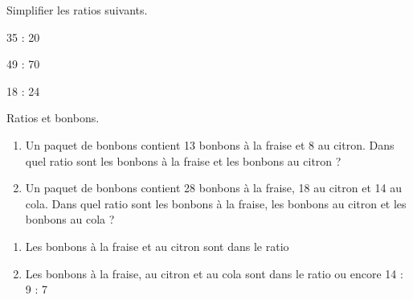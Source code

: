 \begin{Maquette}[Fiche,CorrigeFin,Colonnes=2]{}
   
   \begin{multicols}{2}

      \begin{exercice} %
         Simplifier les ratios suivants.
         \begin{colenumerate}[3]
            \item 35 : 20
            \item 49 : 70
            \item 18 : 24
         \end{colenumerate}
      \end{exercice}
      
      \begin{Solution}
         \begin{colenumerate}[3]
            \item {}
            \item {}
            \item {}
         \end{colenumerate}
      \end{Solution}
      
      
      \begin{exercice} %
         Ratios et bonbons.
         \begin{enumerate}
            \item Un paquet de bonbons contient 13 bonbons à la fraise et 8 au citron. Dans quel ratio sont les bonbons à la fraise et les bonbons au citron ?
            \item Un paquet de bonbons contient 28 bonbons à la fraise, 18 au citron et 14 au cola. Dans quel ratio sont les bonbons à la fraise, les bonbons au citron et les bonbons au cola ?
         \end{enumerate}
      \end{exercice}
      
      \begin{Solution}
         \begin{enumerate}
            \item Les bonbons à la fraise et au citron sont dans le ratio 
            \item Les bonbons à la fraise, au citron et au cola sont dans le ratio  ou encore 14 : 9 : 7
         \end{enumerate}
      \end{Solution}
      

\end{multicols}
\end{Maquette}
